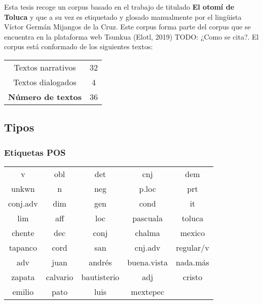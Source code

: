 \documentclass[letterpaper,12pt,oneside]{book}
\begin{document}
Esta tesis recoge un corpus basado en el trabajo de \citet{lastra1992otomi} titulado \textbf{El otomí de Toluca} y que a su vez es etiquetado y glosado manualmente por el lingüista Víctor Germán Mijangos de la Cruz. Este corpus forma parte del corpus que se encuentra en la plataforma web Tsunkua (Elotl, 2019) TODO: ¿Como se cita?. El corpus está conformado de los siguientes textos:

\begin{center}
	\begin{tabular}{ c | c }
		Textos narrativos & 32 \\
		Textos dialogados & 4  \\ \hline
		\textbf{Número de textos}  & 36 \\
	\end{tabular}
\end{center}



\subsection{Tipos}

\subsubsection{Etiquetas POS}

\begin{center}
	\begin{tabular}{| c | c | c | c | c |}
		\hline
		v & obl & det & cnj & dem \\ 
		unkwn & n & neg & p.loc & prt \\
		conj.adv & dim & gen & cond & it \\
	    lim & aff & loc & pascuala & toluca \\
	    chente & dec & conj & chalma & mexico \\
	    tapanco & cord & san & cnj.adv & regular/v \\
	    adv & juan & andrés & buena.vista & nada.más \\
	    zapata & calvario & bautisterio & adj & cristo \\
	    emilio & pato & luis & mextepec & \\
	    \hline
	\end{tabular}
\end{center}
\end{document}
